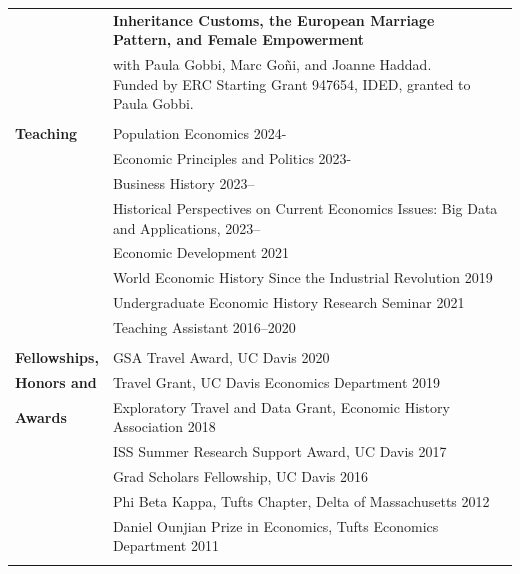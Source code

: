 \documentclass[a4paper,11pt,oneside]{article}
\begin{document}
\begin{longtable}{@{} p{0.175\linewidth} p{0.775\linewidth} p{0.05\linewidth}}
   & \textbf{Inheritance Customs, the European Marriage Pattern, and Female Empowerment}\\ 

   &  with Paula Gobbi, Marc Go\~{n}i, and Joanne Haddad. Funded by ERC Starting Grant 947654, IDED, granted to Paula Gobbi. &  \\
 
   \\
   \textbf{\large{Teaching}}&  \multicolumn{2}{l}{Population Economics  \hfill 2024- }\\ & 
    \multicolumn{2}{l}{Economic  Principles and Politics \hfill 2023- }\\
     &  \multicolumn{2}{l}{Business History  \hfill 2023--}\\
     &  \multicolumn{2}{l}{Historical Perspectives on Current Economics Issues: Big Data and Applications,  \hfill 2023--}\\
   &  \multicolumn{2}{l}{Economic Development  \hfill 2021 }\\
   &  \multicolumn{2}{l}{ World Economic History Since the Industrial Revolution \hfill 2019}\\
   &  \multicolumn{2}{l}{Undergraduate Economic History Research Seminar \hfill  2021} \\
   &  \multicolumn{2}{l}{Teaching Assistant 2016--2020}\\
   
   \\
   
   \textbf{\large{Fellowships,}}   &   \multicolumn{2}{l}{GSA Travel Award, UC Davis  \hfill  2020}\\
   \textbf{\large{Honors and }}   &  \multicolumn{2}{l}{ Travel Grant, UC Davis Economics Department \hfill 2019}\\  
   \textbf{\large{Awards}}  &  \multicolumn{2}{l}{ Exploratory Travel and Data Grant, Economic History Association \hfill 2018}\\
   &  \multicolumn{2}{l}{ ISS Summer Research Support Award, UC Davis \hfill 2017}\\
   &  \multicolumn{2}{l}{ Grad Scholars Fellowship, UC Davis \hfill  2016}\\
   &  \multicolumn{2}{l}{ Phi Beta Kappa, Tufts Chapter, Delta of Massachusetts \hfill 2012}\\
   &   \multicolumn{2}{l}{ Daniel Ounjian Prize in Economics, Tufts Economics Department \hfill 2011}\\
   \\
   

\end{longtable}
\end{document}
